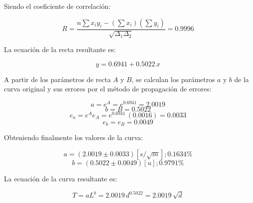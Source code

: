 \documentclass[letter,11pt]{article}
\begin{document}
Siendo el coeficiente de correlación:

\begin{equation*}
    R = \frac{n \sum x_i y_i - (\sum x_i)(\sum y_i)}{\sqrt{\Delta_1 \Delta_2}} = 0.9996
\end{equation*}
\vspace{0.10cm}

La ecuación de la recta resultante es:

\begin{equation*}
    y = 0.6941 + 0.5022\,x
\end{equation*}
\vspace{0.10cm}

A partir de los parámetros de recta $A$ y $B$, se calculan los parámetros $a$ y
$b$ de la curva original y sus errores por el método de propagación de errores:

\begin{equation*}
    a = e^{A} = e^{0.6941} = 2.0019
\end{equation*}
\begin{equation*}
    b = B = 0.5022
\end{equation*}
\begin{equation*}
    e_a = e^A e_A = e^{0.6941}\,(0.0016) = 0.0033
\end{equation*}
\begin{equation*}
    e_b = e_B = 0.0049
\end{equation*}
\vspace{0.10cm}

Obteniendo finalmente los valores de la curva:

\begin{equation*}
    a = (2.0019 \pm 0.0033) [s/\sqrt{m}]; 0.1634 \%
\end{equation*}
\begin{equation*}
    b = (0.5022 \pm 0.0049) [u]; 0.9791 \%
\end{equation*}
\vspace{0.10cm}

La ecuación de la curva resultante es:

\begin{equation*}
    T = a L^b = 2.0019\,d^{0.5022} = 2.0019\,\sqrt{d}
\end{equation*}
\vspace{0.10cm}
\end{document}
